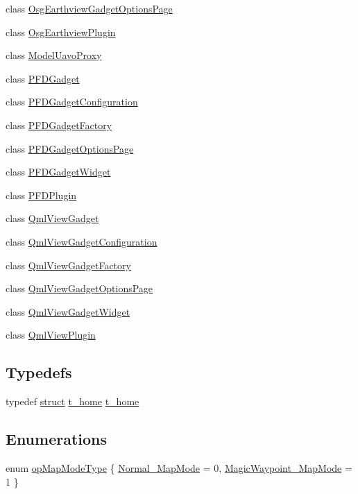 \begin{DoxyCompactItemize}
class \hyperlink{class_osg_earthview_gadget_options_page}{Osg\-Earthview\-Gadget\-Options\-Page}
\item 
class \hyperlink{class_osg_earthview_plugin}{Osg\-Earthview\-Plugin}
\item 
class \hyperlink{class_model_uavo_proxy}{Model\-Uavo\-Proxy}
\item 
class \hyperlink{class_p_f_d_gadget}{P\-F\-D\-Gadget}
\item 
class \hyperlink{class_p_f_d_gadget_configuration}{P\-F\-D\-Gadget\-Configuration}
\item 
class \hyperlink{class_p_f_d_gadget_factory}{P\-F\-D\-Gadget\-Factory}
\item 
class \hyperlink{class_p_f_d_gadget_options_page}{P\-F\-D\-Gadget\-Options\-Page}
\item 
class \hyperlink{class_p_f_d_gadget_widget}{P\-F\-D\-Gadget\-Widget}
\item 
class \hyperlink{class_p_f_d_plugin}{P\-F\-D\-Plugin}
\item 
class \hyperlink{class_qml_view_gadget}{Qml\-View\-Gadget}
\item 
class \hyperlink{class_qml_view_gadget_configuration}{Qml\-View\-Gadget\-Configuration}
\item 
class \hyperlink{class_qml_view_gadget_factory}{Qml\-View\-Gadget\-Factory}
\item 
class \hyperlink{class_qml_view_gadget_options_page}{Qml\-View\-Gadget\-Options\-Page}
\item 
class \hyperlink{class_qml_view_gadget_widget}{Qml\-View\-Gadget\-Widget}
\item 
class \hyperlink{class_qml_view_plugin}{Qml\-View\-Plugin}
\end{DoxyCompactItemize}
\subsection*{Typedefs}
\begin{DoxyCompactItemize}
\item 
typedef \hyperlink{sdlgamepad_8dox_aba655c5729da86df745f0c8e7f9ba8d2}{struct} \hyperlink{structt__home}{t\-\_\-home} \hyperlink{group___o_p_map_plugin_ga11ae47f39c6685b33aac90d5bc1ce28f}{t\-\_\-home}
\end{DoxyCompactItemize}
\subsection*{Enumerations}
\begin{DoxyCompactItemize}
\item 
enum \hyperlink{group___o_p_map_plugin_ga10cb3e7dfbac87e40e00c1a8c76c16e5}{op\-Map\-Mode\-Type} \{ \hyperlink{group___o_p_map_plugin_gga10cb3e7dfbac87e40e00c1a8c76c16e5afdcda6e378c8e0a54e928947a5fdede8}{Normal\-\_\-\-Map\-Mode} = 0, 
\hyperlink{group___o_p_map_plugin_gga10cb3e7dfbac87e40e00c1a8c76c16e5abdc1c0b7296fb52149bbda0739034825}{Magic\-Waypoint\-\_\-\-Map\-Mode} = 1
 \}
\end{DoxyCompactItemize}

